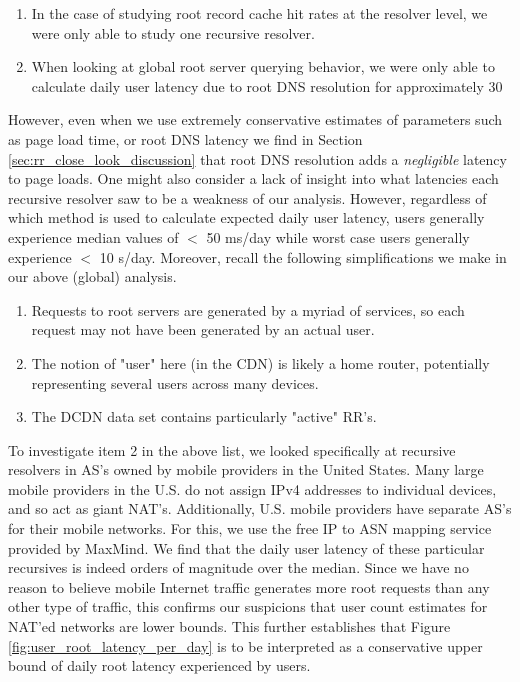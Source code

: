 \documentclass[sigconf,nonacm,10pt]{acmart}
\begin{document}
\begin{enumerate}
        \item In the case of studying root record cache hit rates at the resolver level, we were only able to study one recursive resolver.
        \item When looking at global root server querying behavior, we were only able to calculate daily user latency due to root DNS resolution for approximately 30%
\end{enumerate}

However, even when we use extremely conservative estimates of parameters
such as page load time, or root DNS latency we find in Section
\ref{sec:rr_close_look_discussion} that root DNS resolution adds a
\textit{negligible} latency to page loads. \break
One might also consider a lack of insight into what latencies each
recursive resolver saw to be a weakness of our analysis. However,
regardless of which method is used to calculate expected daily user
latency, users generally experience median values of \(<\) 50 ms/day
while worst case users generally experience \(<\) 10 s/day. Moreover,
recall the following simplifications we make in our above (global)
analysis.

\begin{enumerate}
        \item Requests to root servers are generated by a myriad of services, so each request may not have been generated by an actual user.
        \item The notion of "user" here (in the CDN) is likely a home router, potentially representing several users across many devices.
        \item The DCDN data set contains particularly "active" RR's.
\end{enumerate}

To investigate item 2 in the above list, we looked specifically at
recursive resolvers in AS's owned by mobile providers in the United
States. Many large mobile providers in the U.S. do not assign IPv4
addresses to individual devices, and so act as giant NAT's.
Additionally, U.S. mobile providers have separate AS's for their mobile
networks. For this, we use the free IP to ASN mapping service provided
by MaxMind. We find that the daily user latency of these particular
recursives is indeed orders of magnitude over the median. Since we have
no reason to believe mobile Internet traffic generates more root
requests than any other type of traffic, this confirms our suspicions
that user count estimates for NAT'ed networks are lower bounds. \break
This further establishes that Figure \ref{fig:user_root_latency_per_day}
is to be interpreted as a conservative upper bound of daily root latency
experienced by users.
\end{document}
